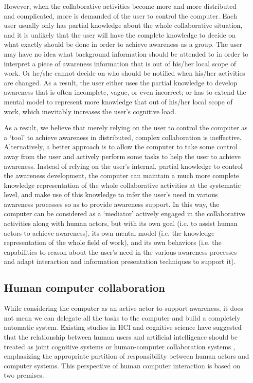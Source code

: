 However, when the collaborative activities become more and more distributed and complicated, more is demanded of the user to control the computer. Each user usually only has partial knowledge about the whole collaborative situation, and it is unlikely that the user will have the complete knowledge to decide on what exactly should be done in order to achieve awareness as a group. The user may have no idea what background information should be attended to in order to interpret a piece of awareness information that is out of his/her local scope of work. Or he/she cannot decide on who should be notified when his/her activities are changed. As a result, the user either uses the partial knowledge to develop awareness that is often incomplete, vague, or even incorrect; or has to extend the mental model to represent more knowledge that out of his/her local scope of work, which inevitably increases the user's cognitive load. 

As a result, we believe that merely relying on the user to control the computer as a `tool' to achieve awareness in distributed, complex collaboration is ineffective. Alternatively, a better approach is to allow the computer to take some control away from the user and actively perform some tasks to help the user to achieve awareness. Instead of relying on the user's internal, partial knowledge to control the awareness development, the computer can maintain a much more complete knowledge representation of the whole collaborative activities at the systematic level, and make use of this knowledge to infer the user's need in various awareness processes so as to provide awareness support. In this way, the computer can be considered as a `mediator' actively engaged in the collaborative activities along with human actors, but with its own goal (i.e. to assist human actors to achieve awareness), its own mental model (i.e. the knowledge representation of the whole field of work), and its own behaviors (i.e. the capabilities to reason about the user's need in the various awareness processes and adapt interaction and information presentation techniques to support it).

\subsection{Human computer collaboration} %
\label{sub:human_computer_collaboration}
While considering the computer as an active actor to support awareness, it does not mean we can delegate all the tasks to the computer and build a completely automatic system. Existing studies in HCI and cognitive science have suggested that the relationship between human users and artificial intelligence should be treated as joint cognitive systems \cite{Dalal1994} or human-computer collaboration systems \cite{Terveen1995}, emphasizing the appropriate partition of responsibility between human actors and computer systems. This perspective of human computer interaction is based on two premises.

